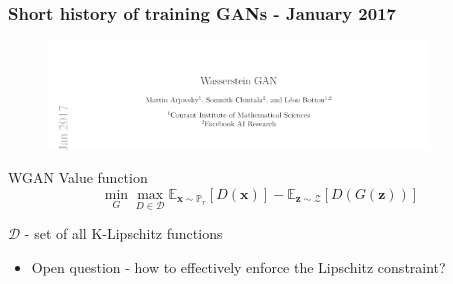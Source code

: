 \documentclass{Bredelebeamer}
\begin{document}

\begin{frame}
	\frametitle{Short history of training GANs - January 2017}
	\begin{figure}[h!]
		\centering
		\includegraphics[width=0.9\textwidth]{wgan_paper.png}
	\end{figure}
	\begin{exampleblock}{WGAN Value function}
	\[
		\min_G \max_{D \in \mathcal{D}} \mathbb{E}_{\bm{x} \sim \mathbb{P}_r} \left[ D(\bm{x}) \right] - \mathbb{E}_{\bm{z} \sim \mathcal{Z}} \left[ D(G(\bm{z}))  \right]
	\]
	\begin{center}
		$\mathcal{D}$ - set of all K-Lipschitz functions
	\end{center}
	\end{exampleblock}
	\begin{itemize}
		\item Open question - how to effectively enforce the Lipschitz constraint?
	\end{itemize}
\end{frame}
\end{document}
